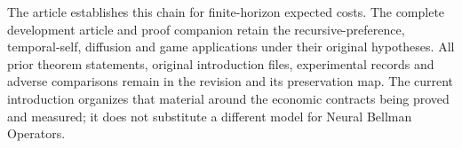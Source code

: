 The article establishes this chain for finite-horizon expected costs. The complete development article and proof companion retain the recursive-preference, temporal-self, diffusion and game applications under their original hypotheses. All prior theorem statements, original introduction files, experimental records and adverse comparisons remain in the revision and its preservation map. The current introduction organizes that material around the economic contracts being proved and measured; it does not substitute a different model for Neural Bellman Operators.
